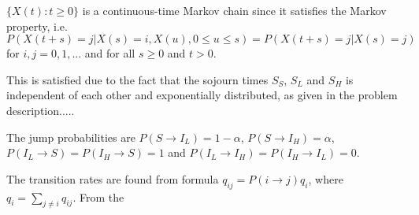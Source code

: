 $\{X(t):t \geq 0 \}$ is a continuous-time Markov chain since it satisfies the Markov property, i.e. 
$$P(X(t+s)=j|X(s)=i, X(u), 0 \leq u \leq s)=P(X(t+s)=j|X(s)=j)$$ 
for $i,j = 0,1,...$ and for all $s \geq 0$ and $t >0 $.

This is satisfied due to the fact that the sojourn times $S_S$, $S_L$ and $S_H$ is independent of each other and exponentially distributed, as given in the problem description..... 

The jump probabilities are $P(S \rightarrow I_L)= 1 - \alpha$, $P(S \rightarrow I_H)= \alpha$, $P(I_L \rightarrow S)= P(I_H \rightarrow S) = 1$ and $P(I_L \rightarrow I_H)= P(I_H \rightarrow I_L) = 0$. 

The transition rates are found from formula $q_{ij} = P(i \rightarrow j ) q_i$, where $q_i = \sum_{j \neq i} q_{ij}$. From the 




